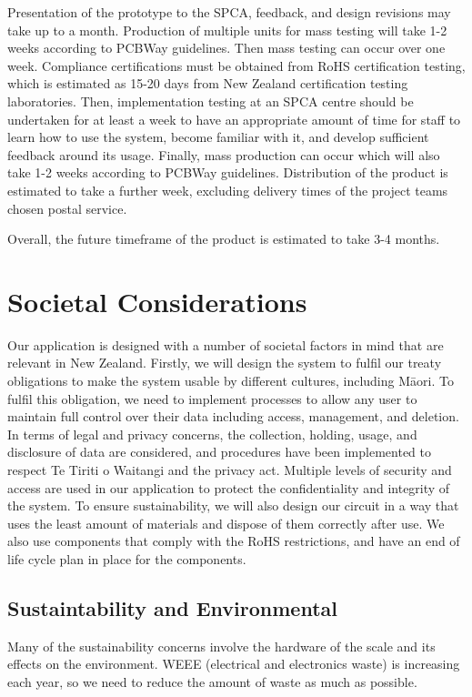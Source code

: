 Presentation of the prototype to the SPCA, feedback, and design revisions may take up to a month. Production of multiple units for mass testing will take 1-2 weeks according to PCBWay guidelines. Then mass testing can occur over one week. Compliance certifications must be obtained from RoHS certification testing, which is estimated as 15-20 days from New Zealand certification testing laboratories. Then, implementation testing at an SPCA centre should be undertaken for at least a week to have an appropriate amount of time for staff to learn how to use the system, become familiar with it, and develop sufficient feedback around its usage. Finally, mass production can occur which will also take 1-2 weeks according to PCBWay guidelines. Distribution of the product is estimated to take a further week, excluding delivery times of the project teams chosen postal service.

Overall, the future timeframe of the product is estimated to take 3-4 months.


\chapter{Societal Considerations}
Our application is designed with a number of societal factors in mind that are relevant in New Zealand. Firstly, we will design the system to fulfil our treaty obligations to make the system usable by different cultures, including Māori. To fulfil this obligation, we need to implement processes to allow any user to maintain full control over their data including access, management, and deletion. In terms of legal and privacy concerns, the collection, holding, usage, and disclosure of data are considered, and procedures have been implemented to respect Te Tiriti o Waitangi and the privacy act. Multiple levels of security and access are used in our application to protect the confidentiality and integrity of the system. To ensure sustainability, we will also design our circuit in a way that uses the least amount of materials and dispose of them correctly after use. We also use components that comply with the RoHS restrictions, and have an end of life cycle plan in place for the components.

\section{Sustaintability and Environmental}

Many of the sustainability concerns involve the hardware of the scale and its effects on the environment. WEEE (electrical and electronics waste) is increasing each year, so we need to reduce the amount of waste as much as possible. 

